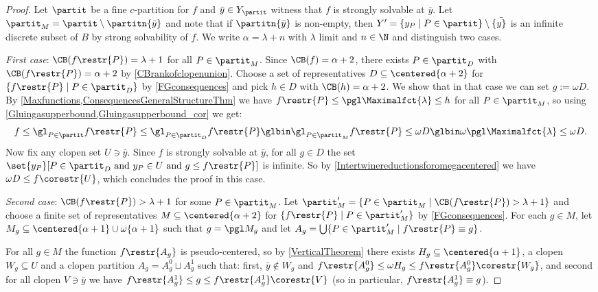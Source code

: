 \begin{proof}
Let $\partit$ be a fine $c$-partition for $f$ and $\bar{y}\in Y_\partit$ witness that $f$ is strongly solvable {at $\bar{y}$}.
Let $\partit_M=\partit\setminus \partitn{\bar{y}}$ and note that if $\partitn{\bar{y}}$ is non-empty, then $Y'=\{y_P\mid P\in \partit\}\setminus\{\bar{y\}}$ is an infinite discrete subset of $B$ by strong solvability of $f$.
We write $\alpha=\lambda+n$ with $\lambda$ limit and $n\in\N$ and distinguish two cases.

\medskip

\textit{First case}: $\CB(f\restr{P})=\lambda+1$ for all $P\in \partit_M$. Since $\CB(f)=\alpha+2$, there exists $P\in\partit_D$ with $\CB(f\restr{P})=\alpha+2$ by \cref{CBrankofclopenunion}.
Choose a set of representatives $D\subseteq \centered{\alpha+2}$ for $\{f\restr{P}\mid P\in \partit_D\}$ by \cref{FGconsequences} and pick $h\in D$ with $\CB(h)=\alpha+2$.
We show that in that case we can set $g:=\omega D$.
By \cref{Maxfunctions,ConsequencesGeneralStructureThm} we have $f\restr{P}\leq\pgl\Maximalfct{\lambda}\leq h$ for all $P\in\partit_M$,
so using \cref{Gluingasupperbound,Gluingasupperbound_cor} we get:
\[
f \leq \gl_{P\in \partit} f\restr{P}\leq \gl_{P\in \partit_D} f\restr{P}\glbin\gl_{P\in \partit_M} f\restr{P}\leq \omega D\glbin \omega \pgl\Maximalfct{\lambda}\leq \omega D.
\]
Now fix any clopen set $U\ni \bar{y}$. Since $f$ is strongly solvable at $\bar{y}$, for all $g\in D$ the set $\set{y_P}[P\in\partit_D \text{ and }y_P\in U \text{ and }g\leq f\restr{P}]$ is infinite. So by \cref{Intertwinereductionsforomegacentered} we have $\omega D\leq f\corestr{U}$, which concludes the proof in this case.

\medskip

\textit{Second case}: $\CB(f\restr{P})> \lambda+1$ for some $P\in \partit_M$. 
Let $\partit'_M=\{P\in \partit_M\mid \CB(f\restr{P})> \lambda+1\}$ and choose a finite set of representatives
$M\subseteq \centered{\alpha+2}$ for $\{f\restr{P}\mid P\in \partit'_M\}$ by \cref{FGconsequences}.
For each $g\in M$, let $M_g\subseteq  \centered{\alpha+1}\cup \omega\{\alpha+1\}$ such that $g=\pgl M_g$ and let $A_g=\bigcup \{P\in \partit'_M\mid f\restr{P}\equiv g\}$. 

For all $g\in M$ the function $f\restr{A_g}$ is pseudo-centered, so by \cref{VerticalTheorem} there exists $H_g\subseteq \centered{\alpha+1}$,
a clopen $W_g\subseteq U$ and a clopen partition $A_g=A^0_g\sqcup A^1_g$ such that: first, $\bar{y}\notin W_g$ and $f\restr{A^0_g}\leq \omega H_g \leq f\restr{A^0_g}\corestr{W_g}$,
and second for all clopen $V\ni \bar{y}$ we have $f\restr{A^1_g}\leq g \leq f\restr{A^1_g}\corestr{V}$ (so in particular,  $f\restr{A^1_g}\equiv g$).



\end{proof}
